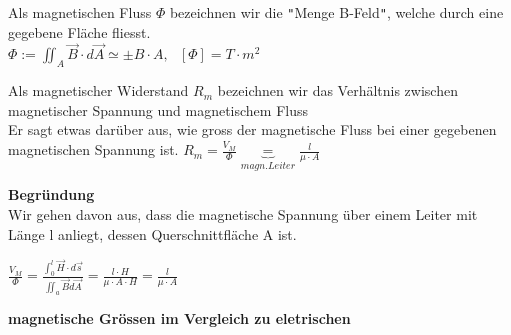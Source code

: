 	\beginip
		Als magnetischen Fluss $\Phi$ bezeichnen wir die \texttt{"}Menge B-Feld\texttt{"}, welche durch eine gegebene Fläche fliesst. \\
		\formulaBegin
		$\displaystyle \Phi := \iint_A \vec{B}  \cdot d\vec{A} \simeq \pm B \cdot A, \ \ \ [\Phi] = T	\cdot m^2 $
		\formulaEnd
	\iend





		\beginip
			Als magnetischer Widerstand $R_m$ bezeichnen wir das Verhältnis zwischen magnetischer Spannung und magnetischem Fluss \\
			Er sagt etwas darüber aus, wie gross der magnetische Fluss bei einer gegebenen magnetischen Spannung ist.
			\formulaBegin
			$\displaystyle R_m = \frac{V_M}{\Phi} \underbrace{=}_{magn. Leiter} \frac{l}{\mu \cdot A}$
			\formulaEnd
		\iend

		\textbf{Begründung} \\
		Wir gehen davon aus, dass die magnetische Spannung über einem Leiter mit Länge l anliegt, dessen Querschnittfläche A ist. \\
		\begin{center}
			$\displaystyle \frac{V_M}{\Phi} = \frac{\int_0^l \vec{H} \cdot d\vec{s}}{\iint_a \vec{B} d \vec{A}} = \frac{l \cdot H}{\mu \cdot A \cdot H} = \frac{l}{\mu \cdot A} $

		\end{center}


\newpage

		\textbf{magnetische Grössen im Vergleich zu eletrischen} \\

